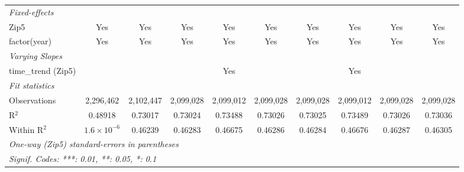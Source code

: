 \begin{table}[H]
{\begin{tabular}{lccccccccc}
 \midrule \emph{Fixed-effects}&   &   &   &   &   &   &   &   &  \\ 

 Zip5 & Yes & Yes & Yes & Yes & Yes & Yes & Yes & Yes & Yes\\ 

 factor(year) & Yes & Yes & Yes & Yes & Yes & Yes & Yes & Yes & Yes\\ 

 \midrule \emph{Varying Slopes}&   &   &   &   &   &   &   &   &  \\ 

 time\_trend (Zip5) &  &  &  & Yes &  &  & Yes &  & \\ 

 \midrule \emph{Fit statistics}&  & & & & & & & & \\ 

 Observations & 2,296,462&2,102,447&2,099,028&2,099,012&2,099,028&2,099,028&2,099,012&2,099,028&2,099,028\\ 

 R$^2$ & 0.48918&0.73017&0.73024&0.73488&0.73026&0.73025&0.73489&0.73026&0.73036\\ 

 Within R$^2$ & $1.6\times 10^{-6}$&0.46239&0.46283&0.46675&0.46286&0.46284&0.46676&0.46287&0.46305\\ 

 \midrule\midrule\multicolumn{10}{l}{\emph{One-way (Zip5) standard-errors in parentheses}}\\ 

 \multicolumn{10}{l}{\emph{Signif. Codes: ***: 0.01, **: 0.05, *: 0.1}}\\ 

 \end{tabular}} 

 \end{table} 

  

